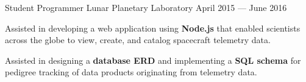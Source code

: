 \begin{cventries}
{\begin{cvitems}
      \end{cvitems}
    }
    \vspace{.07cm}
  \cventry
    {Student Programmer} %
    {Lunar Planetary Laboratory} %
    {April 2015 --- June 2016} %
    {} %
    {
      \vspace{-0.1cm}
      \begin{cvitems} %
        \item Assisted in developing a web application using \textbf{Node.js} that enabled scientists across the globe to view, create, and catalog spacecraft telemetry data.
        \item Assisted in designing a \textbf{database ERD} and implementing a \textbf{SQL schema} for pedigree tracking of data products originating from telemetry data.
      \end{cvitems}
    }

\end{cventries}
